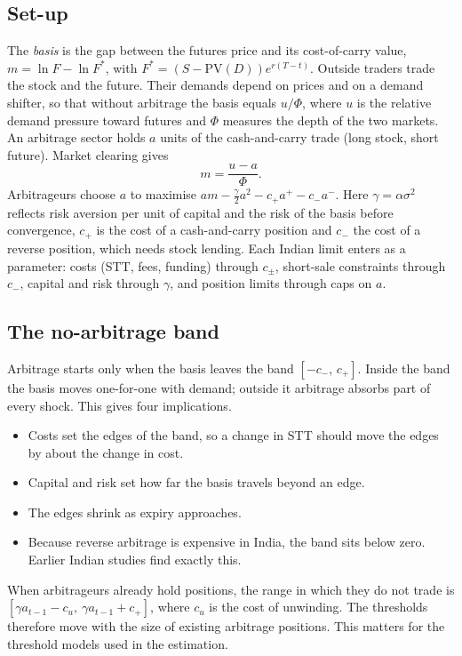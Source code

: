 \documentclass[11pt,a4paper]{article}
\begin{document}
\subsection{Set-up}
The \emph{basis} is the gap between the futures price and its cost-of-carry value, $m=\ln F-\ln F^*$, with
$F^*=(S-\mathrm{PV}(D))e^{r(T-t)}$. Outside traders trade the stock and the future. Their demands depend on prices and on a
demand shifter, so that without arbitrage the basis equals $u/\Phi$, where $u$ is the relative demand pressure toward futures
and $\Phi$ measures the depth of the two markets. An arbitrage sector holds $a$ units of the cash-and-carry trade (long stock,
short future). Market clearing gives
\[
m=\frac{u-a}{\Phi}.
\]
Arbitrageurs choose $a$ to maximise $am-\tfrac{\gamma}{2}a^2-c_+a^+-c_-a^-$. Here $\gamma=\alpha\sigma^2$ reflects risk
aversion per unit of capital and the risk of the basis before convergence, $c_+$ is the cost of a cash-and-carry position and
$c_-$ the cost of a reverse position, which needs stock lending. Each Indian limit enters as a parameter: costs (STT, fees,
funding) through $c_\pm$, short-sale constraints through $c_-$, capital and risk through $\gamma$, and position limits through
caps on $a$.

\subsection{The no-arbitrage band}
Arbitrage starts only when the basis leaves the band $[-c_-,\,c_+]$. Inside the band the basis moves one-for-one with demand;
outside it arbitrage absorbs part of every shock. This gives four implications.
\begin{itemize}
\item Costs set the edges of the band, so a change in STT should move the edges by about the change in cost.
\item Capital and risk set how far the basis travels beyond an edge.
\item The edges shrink as expiry approaches.
\item Because reverse arbitrage is expensive in India, the band sits below zero. Earlier Indian studies find exactly this.
\end{itemize}
When arbitrageurs already hold positions, the range in which they do not trade is
$[\gamma a_{t-1}-c_u,\ \gamma a_{t-1}+c_+]$, where $c_u$ is the cost of unwinding. The thresholds therefore move with the size
of existing arbitrage positions. This matters for the threshold models used in the estimation.
\end{document}

